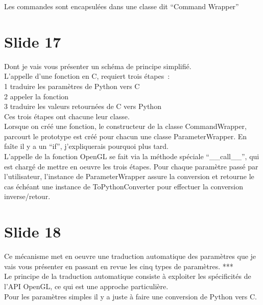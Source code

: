 \documentclass[12pt]{article}
\begin{document}
\noindent%
Les commandes sont encapsulées dans une classe dit ``Command Wrapper'' 

\section{Slide 17}

\noindent%
Dont je vais vous présenter un schéma de principe simplifié. \\

\noindent%
L'appelle d'une fonction en C, requiert trois étapes~: \\
 1 traduire les paramètres de Python vers C \\
 2 appeler la fonction \\
 3 traduire les valeurs retournées de C vers Python \\

\noindent%
Ces trois étapes ont chacune leur classe. \\

\noindent%
Lorsque on créé une fonction, le constructeur de la classe CommandWrapper, parcourt le prototype est
créé pour chacun une classe ParameterWrapper. En faîte il y a un ``if'', j'expliquerais pourquoi
plus tard. \\

\noindent%
L'appelle de la fonction OpenGL se fait via la méthode spéciale ``\_\_call\_\_'', qui est chargé de
mettre en oeuvre les trois étapes. Pour chaque paramètre passé par l'utilisateur, l'instance de
ParameterWrapper assure la conversion et retourne le cas échéant une instance de ToPythonConverter
pour effectuer la conversion inverse/retour. 

\section{Slide 18}

\noindent%
Ce mécanisme met en oeuvre une traduction automatique des paramètres que je vais vous présenter en
passant en revue les cinq types de paramètres. *** \\

\noindent%
Le principe de la traduction automatique consiste à exploiter les spécificités de l'API OpenGL, ce
qui est une approche particulière. \\

\noindent%
Pour les paramètres simples il y a juste à faire une conversion de Python vers C. \\
\end{document}

